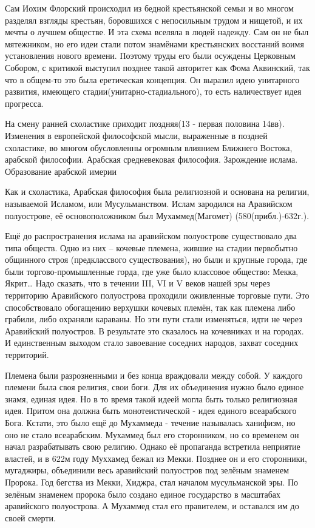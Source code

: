 Сам Иохим Флорский происходил из бедной крестьянской семьи и во многом разделял взгляды крестьян, боровшихся с непосильным трудом и нищетой, и их мечты о лучшем обществе. И эта схема вселяла в людей надежду. Сам он не был мятежником, но его идеи стали потом знамёнами крестьянских восстаний воимя установления нового времени. Поэтому труды его были осуждены Церковным Собором, с критикой выступил позднее такой авторитет как Фома Аквинский, так что в общем-то это была еретическая концепция. Он выразил идею унитарного развития, имеющего стадии(унитарно-стадиального), то есть наличествует идея прогресса.

На смену ранней схоластике приходит поздняя(13 - первая половина 14вв). Изменения в европейской философской мысли, выраженные в поздней схоластике, во многом обусловленны огромным влиянием Ближнего Востока, арабской философии.
Арабская средневековая философия.
Зарождение ислама. Образование арабской имерии

Как и схоластика, Арабская философия была религиозной и основана на религии, называемой Исламом, или Мусульманством. Ислам зародился на Аравийском полуострове, её основоположником был Мухаммед(Магомет) (580(прибл.)-632г.).

Ещё до распространения ислама на аравийском полуострове существовало два типа обществ. Одно из них – кочевые племена, жившие на стадии первобытно общинного строя (предклассвого существования), но были и крупные города, где были торгово-промышленные горда, где уже было классовое общество: Мекка, Якрит… Надо сказать, что в течении III, VI и V веков нашей эры через территорию Аравийского полуострова проходили оживленные торговые пути. Это способствовало обогащению верхушки кочевых племён, так как племена либо грабили, либо охраняли караваны. Но эти пути стали изменяться, идти не через Аравийский полуостров. В результате это сказалось на кочевниках и на городах. И единственным выходом стало завоевание соседних народов, захват соседних территорий.

Племена были разрозненными и без конца враждовали между собой. У каждого племени была своя религия, свои боги. Для их объединения нужно было единое знамя, единая идея. Но в то время такой идеей могла быть только религиозная идея. Притом она должна быть монотеистической - идея единого всеарабского Бога. Кстати, это было ещё до Мухаммеда - течение называлась ханифизм, но оно не стало всеарабским. Мухаммед был его сторонником, но со временем он начал разрабатывать свою религию. Однако её пропаганда встретила неприятие властей, и в 622м году Муххамед бежал из Мекки. Позднее он и его сторонники, мугаджиры, объединили весь аравийский полуостров под зелёным знаменем Пророка. Год бегства из Мекки, Хиджра, стал началом мусульманской эры. По зелёным знаменем пророка было создано единое государство в масштабах аравийского полуострова. А Мухаммед стал его правителем, и оставался им до своей смерти.

